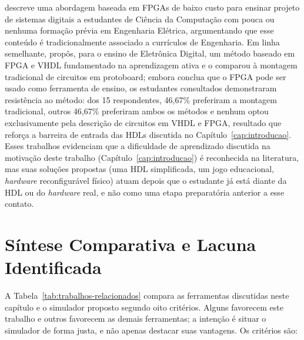  descreve uma abordagem baseada em FPGAs de baixo custo para ensinar projeto de sistemas digitais a estudantes de Ciência da Computação com pouca ou nenhuma formação prévia em Engenharia Elétrica, argumentando que esse conteúdo é tradicionalmente associado a currículos de Engenharia. Em linha semelhante,  propôs, para o ensino de Eletrônica Digital, um método baseado em FPGA e VHDL fundamentado na aprendizagem ativa e o comparou à montagem tradicional de circuitos em protoboard; embora conclua que o FPGA pode ser usado como ferramenta de ensino, os estudantes consultados demonstraram resistência ao método: dos 15 respondentes, 46,67\% preferiram a montagem tradicional, outros 46,67\% preferiram ambos os métodos e nenhum optou exclusivamente pela descrição de circuitos em VHDL e FPGA, resultado que reforça a barreira de entrada das HDLs discutida no Capítulo~\ref{cap:introducao}. Esses trabalhos evidenciam que a dificuldade de aprendizado discutida na motivação deste trabalho (Capítulo~\ref{cap:introducao}) é reconhecida na literatura, mas suas soluções propostas (uma HDL simplificada, um jogo educacional, \textit{hardware} reconfigurável físico) atuam depois que o estudante já está diante da HDL ou do \textit{hardware} real, e não como uma etapa preparatória anterior a esse contato.

\section{Síntese Comparativa e Lacuna Identificada}
\label{sec:sintese-comparativa}

A Tabela~\ref{tab:trabalhos-relacionados} compara as ferramentas discutidas neste capítulo e o simulador proposto segundo oito critérios. Alguns favorecem este trabalho e outros favorecem as demais ferramentas; a intenção é situar o simulador de forma justa, e não apenas destacar suas vantagens. Os critérios são:

